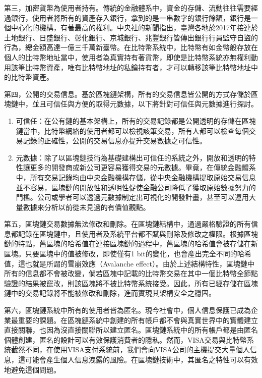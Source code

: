 				第三，加密貨幣為使用者持有。傳統的金融體系中，資金的存儲、流動往往需要經過銀行，使用者將所有的資產存入銀行，拿到的是一串數字的銀行餘額，銀行是一個中心化的機構，有著最高的權利。中央社的新聞\supercite{Bankguardsstolen}指出，臺灣各地於2017年接連於土地銀行、日盛銀行、彰化銀行、京城銀行、兆豐銀行皆傳出銀行行員監守自盜的行為，總金額高達一億三千萬新臺幣。在比特幣系統中，比特幣有如金幣般存放在個人的比特幣地址當中，使用者為真實持有著貨幣，即使是比特幣系統亦無權利動用該筆比特幣資產，唯有比特幣地址的私鑰持有者，才可以轉移該筆比特幣地址中的比特幣資產。

				第四，公開的交易信息。基於區塊鏈架構，所有的交易信息皆公開的方式存儲於區塊鏈中，並且可信任與方便的取得元數據，以下將針對可信任與元數據進行探討。
				\begin{enumerate}
					\item 可信任：在公有鏈的基本架構上，所有的交易記錄都是公開透明的存儲在區塊鏈當中，比特幣網絡的使用者都可以檢視該筆交易，所有人都可以檢查每個交易記錄的正確性，公開的交易信息亦提升交易數據之可信性。
					\item 元數據：除了以區塊鏈技術為基礎建構出可信任的系統之外，開放和透明的特性讓更多的開發商或新公司更容易獲得交易的元數據。畢竟，在傳統金融體系中，所有交易記錄均由中央金融機構存儲，從中央金融機構提取原始交易信息並不容易，區塊鏈的開放性和透明性促使金融公司降低了獲取原始數據努力的門檻。公司或學者可以透過元數據制定出可視化的開發計畫，甚至可以運用大量數據來分析以前從未見過的有價值觀點。
				\end{enumerate}

				第五，區塊鏈交易數據無法修改和刪除。在區塊鏈結構中，通過嚴格驗證的所有信息都記錄在區塊鏈中，且使用者及系統平台都不賦與刪除及修改之權限。根據區塊鏈的特點，舊區塊的哈希值在連接區塊鏈的過程中，舊區塊的哈希值會被存儲在新區塊。只要區塊中的值被修改，即使僅有1 bit的變化，也會產出完全不同的哈希值，這也就是所謂的雪崩效應（Avalanche effect）\supercite{Theuseofbentsequencestoachievehigher-orderstrictavalanchecriterioninS-boxdesign}。由於上述結構特性，區塊鏈中所有的信息都不會被改變，倘若區塊中記載的比特幣交易在其中一個比特幣全節點驗證的結果被竄改，則該區塊將不被比特幣系統接受。因此，所有已經存儲在區塊鏈中的交易記錄將不能被修改和刪除，進而實現其架構安全之穩固。

				第六，區塊鏈系統中所有的使用者皆為匿名。現今社會中，個人信息保護已成為企業最重要的課題。在區塊鏈系統中創建的所有帳戶都不會與真實世界中的實體建立直接關聯，也因為沒直接關聯所以建立匿名。區塊鏈系統中的所有帳戶都是由匿名個體創建，匿名的設計可以有效保護消費者的隱私。然而，VISA交易與比特幣系統截然不同，在使用VISA支付系統前，我們會向VISA公司的主機提交大量個人信息，這可能會產生個人信息洩露的風險。在區塊鏈技術中，其匿名之特性可以有效地避免這個問題。

